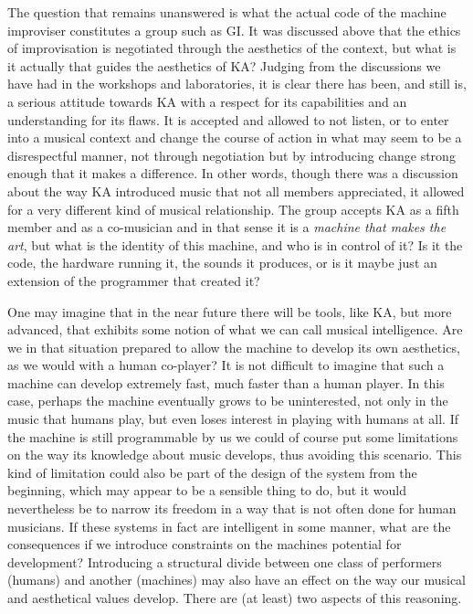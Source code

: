 \documentclass[11pt]{article}
\begin{document}
The question that remains unanswered is what the actual code of the
machine improviser constitutes a group such as GI. It was discussed
above that the ethics of improvisation is negotiated through the
aesthetics of the context, but what is it actually that guides the
aesthetics of KA? Judging from the discussions we have had in the
workshops and laboratories, it is clear there has been, and still is,
a serious attitude towards KA with a respect for its capabilities and
an understanding for its flaws. It is accepted and allowed to not
listen, or to enter into a musical context and change the course of
action in what may seem to be a disrespectful manner, not through
negotiation but by introducing change strong enough that it makes a
difference. In other words, though there was a discussion about the
way KA introduced music that not all members appreciated, it allowed
for a very different kind of musical relationship. The group accepts
KA as a fifth member and as a co-musician and in that sense it is a
\emph{machine that makes the art}, but what is the identity of this
machine, and who is in control of it? Is it the code, the hardware
running it, the sounds it produces, or is it maybe just an extension
of the programmer that created it?

One may imagine that in the near future there will be tools, like KA,
but more advanced, that exhibits some notion of what we can call
musical intelligence. Are we in that situation prepared to allow the
machine to develop its own aesthetics, as we would with a human
co-player? It is not difficult to imagine that such a machine can
develop extremely fast, much faster than a human player. In this case,
perhaps the machine eventually grows to be uninterested, not only in
the music that humans play, but even loses interest in playing with
humans at all. If the machine is still programmable by us we could of
course put some limitations on the way its knowledge about music
develops, thus avoiding this scenario. This kind of limitation could
also be part of the design of the system from the beginning, which may
appear to be a sensible thing to do, but it would nevertheless be to
narrow its freedom in a way that is not often done for human
musicians. If these systems in fact are intelligent in some manner,
what are the consequences if we introduce constraints on the machines
potential for development? Introducing a structural divide between one
class of performers (humans) and another (machines) may also have an
effect on the way our musical and aesthetical values develop. There
are (at least) two aspects of this reasoning.
\end{document}
